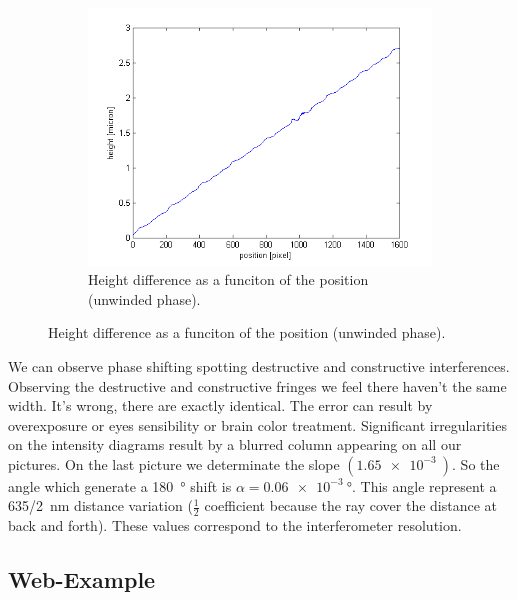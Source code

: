 \documentclass[a4paper, 12pt]{paper}
\begin{document}
\begin{figure}[H]
\begin{subfigure}[t]{0.45\textwidth}
        \includegraphics[width=\textwidth]{img/phase_developped}
        \caption{Height difference as a funciton of the position (unwinded phase).}
    \end{subfigure}
\label{fig:phase_shift}
\end{figure}

We can observe phase shifting spotting destructive and constructive interferences.
Observing the destructive and constructive fringes we feel there haven’t the same width.
It’s wrong, there are exactly identical.
The error can result by overexposure or eyes sensibility or brain color treatment.
Significant irregularities on the intensity diagrams result by a blurred column appearing on all our pictures.
On the last picture we determinate the slope $\left( \SI{1.65e-3}{} \right)$.
So the angle which generate a \SI{180}{\degree} shift is $\alpha = \SI{0.06e-3}{\degree}$.
This angle represent a \SI{635/2}{\nano\meter} distance variation ($\frac{1}{2}$ coefficient because the ray cover the distance at back and forth).
These values correspond to the interferometer resolution. 

\subsection{Web-Example}
\end{document}
